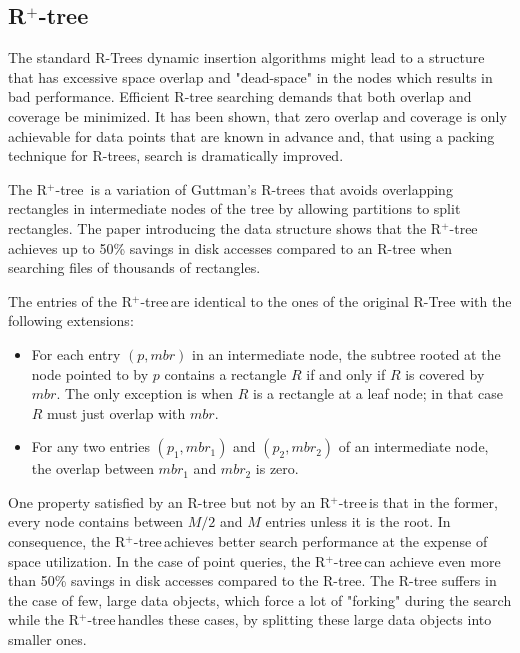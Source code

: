\documentclass[11pt, a4paper, oneside]{article}
\newcommand{\rplus}{R$^+$-tree$\,$}
\begin{document}
\subsection{\rplus}

The standard R-Trees dynamic insertion algorithms might lead to a structure that has excessive space overlap and "dead-space" in the nodes which results in bad performance. Efficient R-tree searching demands that both overlap and coverage be minimized. It has been shown, that zero overlap and coverage is only achievable for data points that are known in advance and, that using a packing technique for R-trees, search is dramatically improved\cite{Roussopoulos85directspatial}.

The \rplus \cite{Sellis:1987:RDI:645914.671636} is a variation of Guttman's R-trees that avoids overlapping rectangles in intermediate nodes of the tree by allowing partitions to split rectangles. The paper introducing the data structure shows that the \rplus achieves up to 50\% savings in disk accesses compared to an R-tree when searching files of thousands of rectangles.

The entries of the \rplus are identical to the ones of the original R-Tree with the following extensions\cite{Sellis:1987:RDI:645914.671636}:
\begin{itemize}
\item For each entry $(p,mbr)$ in an intermediate node, the subtree rooted at the node pointed to
by $p$ contains a rectangle $R$ if and only if $R$ is covered by $mbr$. The only exception is when
$R$ is a rectangle at a leaf node; in that case $R$ must just overlap with $mbr$.

\item For any two entries $(p_1 , mbr_1 )$ and $(p_2, mbr_2)$ of an intermediate node, the overlap between $mbr_1$ and $mbr_2$ is zero.

\end{itemize}

One property satisfied by an R-tree but not by an \rplus is that in the former, every node contains between $M/2$ and $M$ entries unless it is the root. In consequence, the \rplus achieves better search performance at the expense of space utilization. In the case of point queries, the \rplus can achieve  even more than 50\% savings in disk accesses compared to the R-tree. The R-tree suffers in the case of few, large data objects, which force a lot of "forking" during the search while the \rplus handles these cases, by splitting these large data objects into smaller ones.
\end{document}
